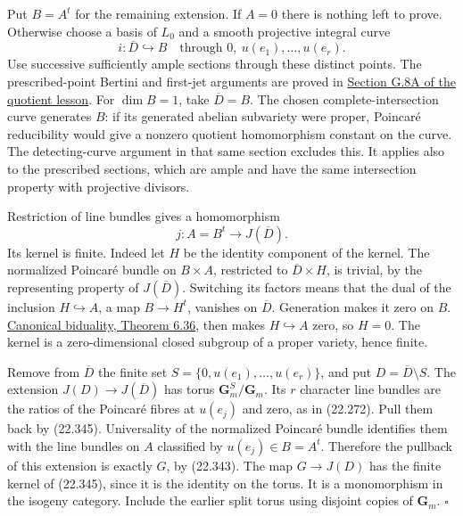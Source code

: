 \documentclass[
  11pt,
  a4paper,
]{article}
\begin{document}
Put \(B=A^t\) for the remaining extension. If \(A=0\) there is nothing
left to prove. Otherwise choose a basis of \(L_0\) and a smooth
projective integral curve \[
 i:\overline D\hookrightarrow B
 \quad\text{through }0,\ u(e_1),\ldots,u(e_r).
 \tag{22.344}
\] Use successive sufficiently ample sections through these distinct
points. The prescribed-point Bertini and first-jet arguments are proved
in
\href{https://kokunoyumeto.github.io/open-math-courses-public/courses/AG-GS/AG-GS-04.html\#g-8a-a-detecting-complete-curve}{Section
G.8A of the quotient lesson}. For \(\dim B=1\), take \(\overline D=B\).
The chosen complete-intersection curve generates \(B\): if its generated
abelian subvariety were proper, Poincaré reducibility would give a
nonzero quotient homomorphism constant on the curve. The detecting-curve
argument in that same section excludes this. It applies also to the
prescribed sections, which are ample and have the same intersection
property with projective divisors.

Restriction of line bundles gives a homomorphism \[
 j:A=B^t\longrightarrow J(\overline D).
 \tag{22.345}
\] Its kernel is finite. Indeed let \(H\) be the identity component of
the kernel. The normalized Poincaré bundle on \(B\times A\), restricted
to \(\overline D\times H\), is trivial, by the representing property of
\(J(\overline D)\). Switching its factors means that the dual of the
inclusion \(H\hookrightarrow A\), a map \(B\to H^t\), vanishes on
\(\overline D\). Generation makes it zero on \(B\).
\href{https://github.com/KokunoYumeto/open-math-courses-public/blob/146dc81802e69cf262fb6cc65c1b9f74e71f4625/docs/courses/AG-GS/src/abelian-varieties.md\#the-bidual-and-symmetric-translation-maps}{Canonical
biduality, Theorem 6.36}, then makes \(H\hookrightarrow A\) zero, so
\(H=0\). The kernel is a zero-dimensional closed subgroup of a proper
variety, hence finite.

Remove from \(\overline D\) the finite set
\(S=\{0,u(e_1),\ldots,u(e_r)\}\), and put \(D=\overline D\setminus S\).
The extension \(J(D)\to J(\overline D)\) has torus
\(\mathbf G_m^S/\mathbf G_m\). Its \(r\) character line bundles are the
ratios of the Poincaré fibres at \(u(e_j)\) and zero, as in (22.272).
Pull them back by (22.345). Universality of the normalized Poincaré
bundle identifies them with the line bundles on \(A\) classified by
\(u(e_j)\in B=A^t\). Therefore the pullback of this extension is exactly
\(G\), by (22.343). The map \(G\to J(D)\) has the finite kernel of
(22.345), since it is the identity on the torus. It is a monomorphism in
the isogeny category. Include the earlier split torus using disjoint
copies of \(\mathbf G_m\). \(\square\)
\end{document}

